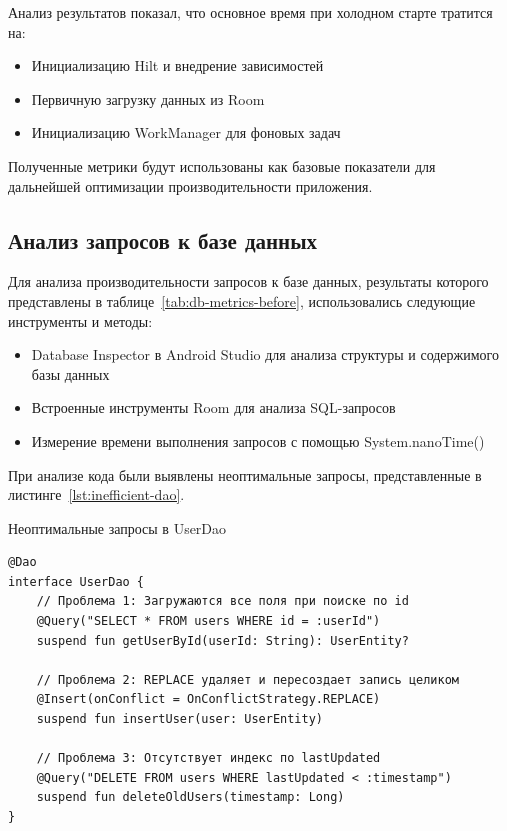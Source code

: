 \documentclass[14pt, russian]{scrartcl}
\begin{document}
Анализ результатов показал, что основное время при холодном старте тратится на:
\begin{itemize}
\item Инициализацию Hilt и внедрение зависимостей
\item Первичную загрузку данных из Room
\item Инициализацию WorkManager для фоновых задач
\end{itemize}

Полученные метрики будут использованы как базовые показатели для дальнейшей оптимизации производительности приложения.

\subsection{Анализ запросов к базе данных}\label{sect:database-analysis}

Для анализа производительности запросов к базе данных, результаты которого представлены в таблице~\ref{tab:db-metrics-before}, использовались следующие инструменты и методы:
\begin{itemize}
\item Database Inspector в Android Studio для анализа структуры и содержимого базы данных
\item Встроенные инструменты Room для анализа SQL-запросов
\item Измерение времени выполнения запросов с помощью System.nanoTime()
\end{itemize}

При анализе кода были выявлены неоптимальные запросы, представленные в листинге~\ref{lst:inefficient-dao}.

\begin{listing}[!htb]
\caption{Неоптимальные запросы в UserDao}
\vspace{-0.3cm}
\label{lst:inefficient-dao}
\begin{verbatim}
@Dao
interface UserDao {
    // Проблема 1: Загружаются все поля при поиске по id
    @Query("SELECT * FROM users WHERE id = :userId")
    suspend fun getUserById(userId: String): UserEntity?
    
    // Проблема 2: REPLACE удаляет и пересоздает запись целиком
    @Insert(onConflict = OnConflictStrategy.REPLACE)
    suspend fun insertUser(user: UserEntity)
    
    // Проблема 3: Отсутствует индекс по lastUpdated
    @Query("DELETE FROM users WHERE lastUpdated < :timestamp")
    suspend fun deleteOldUsers(timestamp: Long)
}
\end{verbatim}
\end{listing}
\end{document}
